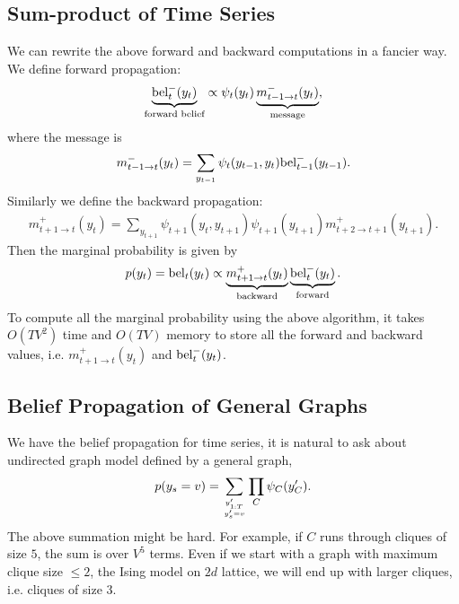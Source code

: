 \documentclass{article}
\begin{document}
\subsection{Sum-product of Time Series}
We can rewrite the above forward and backward computations in a fancier way. We define forward propagation:
\begin{align*}
\underbrace{{\rm bel}_t^-(y_t)}_{\text{forward belief}}
\propto \psi_t(y_t)
\underbrace{m_{t-1\rightarrow t}^-(y_t)}_{\text{message}},
\end{align*}
where the message is 
\begin{align*}
m_{t-1\rightarrow t}^-(y_t)=\sum_{y_{t-1}}\psi_t(y_{t-1},y_t){\rm bel}_{t-1}^-(y_{t-1}).
\end{align*}
Similarly we define the backward propagation:
\begin{align*}
m_{t+1\rightarrow t}^+(y_t)=\sum_{y_{t+1}}\psi_{t+1}(y_t,y_{t+1})\psi_{t+1}(y_{t+1})m_{t+2\rightarrow t+1}^+(y_{t+1}).
\end{align*}
Then the marginal probability is given by 
\begin{align*}
p(y_t)={\rm bel}_t(y_t)\propto \underbrace{m_{t+1\rightarrow t}^+(y_t)}_{\text{backward}}\underbrace{{\rm bel}_t^{-}(y_t)}_{\text{forward}}.
\end{align*}
To compute all the marginal probability using the above algorithm, it takes $O(TV^2)$ time and $O(TV)$ memory to store all the forward and backward values, i.e. $m_{t+1\rightarrow t}^+(y_t)$ and ${\rm bel}_t^{-}(y_t)$.

\subsection{Belief Propagation of General Graphs}
We have the belief propagation for time series, it is natural to ask about
undirected graph model defined by a general graph, 
\begin{align*}
p(y_s=v)=\sum_{y'_{1:T}\atop y_s'=v}\prod_C\psi_C(y_C').
\end{align*}
The above summation might be hard. For example, if $C$ runs through cliques of size $5$, the sum is over $V^5$ terms. Even if we start with a graph with maximum clique size $\leq 2$, the Ising model on $2d$ lattice, we will end up with larger cliques, i.e. cliques of size $3$.
\end{document}
